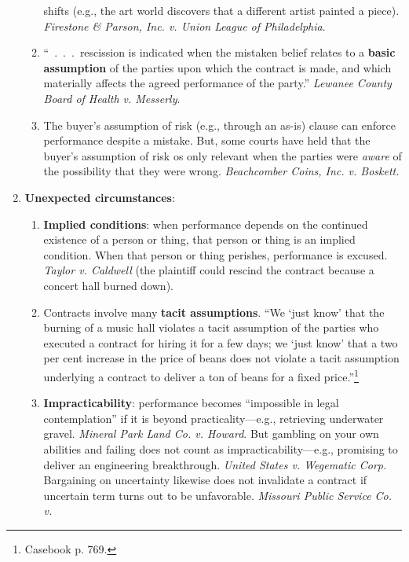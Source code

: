 \begin{enumerate}
\begin{enumerate}
        shifts (e.g., the art world discovers that a different artist painted 
        a piece). \emph{Firestone \& Parson, Inc. v. Union League of 
        Philadelphia}.
        \item ``~.~.~.~rescission is indicated when the mistaken belief 
        relates to a \textbf{basic assumption} of the parties upon which the 
        contract is made, and which materially affects the agreed performance 
        of the party.'' \emph{Lewanee County Board of Health v. Messerly}.
        \item The buyer's assumption of risk (e.g., through an as-is) clause 
        can enforce performance despite a mistake. But, some courts have held 
        that the buyer's assumption of risk os only relevant when the parties 
        were \emph{aware} of the possibility that they were wrong. 
        \emph{Beachcomber Coins, Inc. v. Boskett.}
    \end{enumerate}
    \item \textbf{Unexpected circumstances}:
    \begin{enumerate}
        \item \textbf{Implied conditions}: when performance depends on the 
        continued existence of a person or thing, that person or thing is an 
        implied condition. When that person or thing perishes, performance is 
        excused. \emph{Taylor v. Caldwell} (the plaintiff could rescind the 
        contract because a concert hall burned down).
        \item Contracts involve many \textbf{tacit assumptions}.  \enquote{We 
        `just know' that the burning of a music hall violates a tacit 
        assumption of the parties who executed a contract for hiring it for a 
        few days; we `just know' that a two per cent increase in the price of 
        beans does not violate a tacit assumption underlying a contract to 
        deliver a ton of beans for a fixed price.}\footnote{Casebook p. 769.}
        \item \textbf{Impracticability}: performance becomes ``impossible in 
        legal contemplation'' if it is beyond practicality---e.g., retrieving 
        underwater gravel. \emph{Mineral Park Land Co. v. Howard}. But 
        gambling on your own abilities and failing does not count as 
        impracticability---e.g., promising to deliver an engineering 
        breakthrough. \emph{United States v. Wegematic Corp.} Bargaining on 
        uncertainty likewise does not invalidate a contract if uncertain term 
        turns out to be unfavorable. \emph{Missouri Public Service Co. v. 
}
\end{enumerate}
\end{enumerate}
